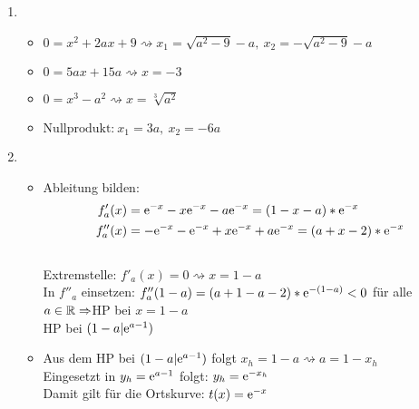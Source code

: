 \begin{lsg}{}
	\begin{enumerate}
		\item \begin{itemize}
			\item $0=x^2+2ax+9 \rightsquigarrow x_1=\sqrt{a^2-9}-a,\ x_2=-\sqrt{a^2-9}-a$\\
			\item $0=5ax+15a \rightsquigarrow x=-3$\\
			\item $0=x^3-a^2 \rightsquigarrow x=\sqrt[3]{a^2}$\\
			\item $\text{Nullprodukt:}\ x_1=3a,\ x_2=-6a$
		\end{itemize}
		\item \begin{itemize}
			\item Ableitung bilden: \begin{align*}
				f'_a(x)&=\mathrm{e}^{-x}-x\mathrm{e}^{-x}-a\mathrm{e}^{-x}=(1-x-a)*\mathrm{e}^{-x}\\
				f''_a(x)&=-\mathrm{e}^{-x}-\mathrm{e}^{-x}+x\mathrm{e}^{-x}+a\mathrm{e}^{-x}=(a+x-2)*\mathrm{e}^{-x}
			\end{align*}\\
			Extremstelle: $f'_a(x)=0 \rightsquigarrow x=1-a$ \\
			In $f''_a$ einsetzen: $f''_a(1-a)=(a+1-a-2)*\mathrm{e}^{-(1-a)}<0$ für alle $a\in \mathbb{R}\Rightarrow $HP bei $x=1-a$\\
			HP bei $(1-a|\mathrm{e}^{a-1})$
			\item Aus dem HP bei $(1-a|\mathrm{e}^{a-1})$ folgt $x_{h}=1-a \rightsquigarrow a=1-x_{h}$\\
			Eingesetzt in $y_{h}=\mathrm{e}^{a-1}$ folgt: $y_h=\mathrm{e}^{-x_h}$ \\
			Damit gilt für die Ortskurve: $t(x)=\mathrm{e}^{-x}$ 
			
		\end{itemize}

	\end{enumerate}
\end{lsg}


